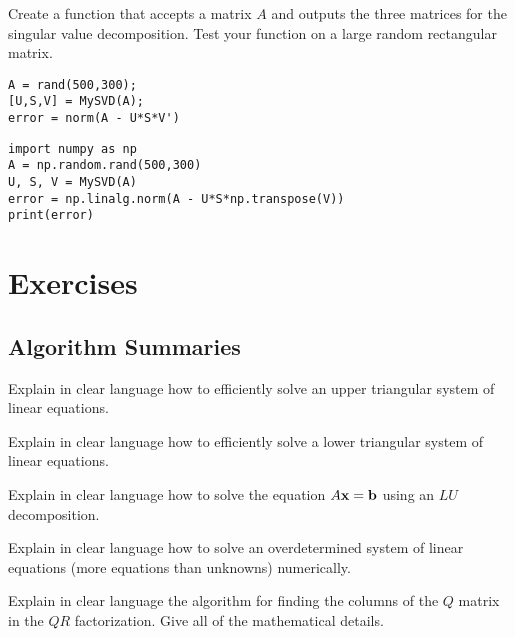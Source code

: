 \begin{problem}
    Create a \ProgLang function that accepts a matrix $A$ and outputs the three matrices for
    the singular value decomposition.  Test your function on a large random rectangular
    matrix.
    \ifnum{}
\begin{lstlisting}
A = rand(500,300);
[U,S,V] = MySVD(A);
error = norm(A - U*S*V')
\end{lstlisting}
\else
\begin{lstlisting}
import numpy as np
A = np.random.rand(500,300)
U, S, V = MySVD(A)
error = np.linalg.norm(A - U*S*np.transpose(V))
print(error)
\end{lstlisting}
\fi
\end{problem}






\newpage\section{Exercises}

\subsection{Algorithm Summaries}

\begin{problem}
    Explain in clear language how to efficiently solve an upper triangular system of
    linear equations.
\end{problem}

\begin{problem}
    Explain in clear language how to efficiently solve a lower triangular system of
    linear equations.
\end{problem}

\begin{problem}
    Explain in clear language how to solve the equation $A {\bf x} = {\bf b}$ using an $LU$
    decomposition.  
\end{problem}

\begin{problem}
    Explain in clear language how to solve an overdetermined system of linear equations (more
    equations than unknowns) numerically.
\end{problem}

\begin{problem}
    Explain in clear language the algorithm for finding the columns of the $Q$ matrix in
    the $QR$ factorization.  Give all of the mathematical details.
\end{problem}

